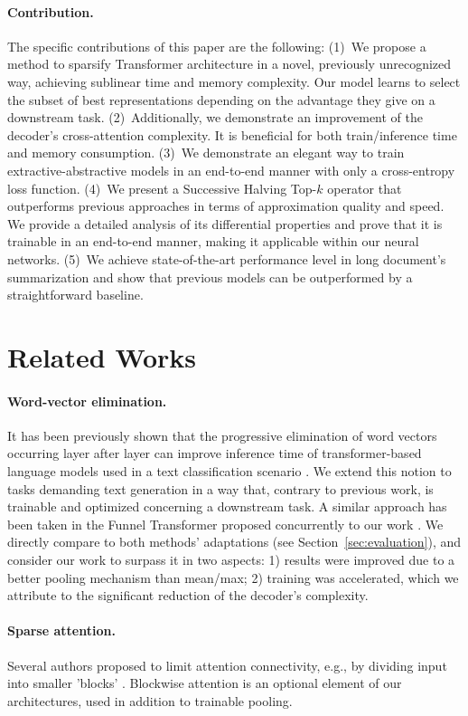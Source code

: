 \documentclass{article}
\begin{document}
\paragraph{Contribution.} The specific contributions of this paper are the following: (1)~We propose a method to sparsify Transformer architecture in a novel, previously unrecognized way, achieving sublinear time and memory complexity. Our model learns to select the subset of best representations depending on the advantage they give on a downstream task.
(2)~Additionally, we demonstrate an improvement of the decoder's cross-attention complexity. It is beneficial for both train/inference time and memory consumption.
(3)~We demonstrate an elegant way to train extractive-abstractive models in an end-to-end manner with only a cross-entropy loss function. (4)~We present a Successive Halving Top-$k$ operator that outperforms previous approaches in terms of approximation quality and speed. We provide a detailed analysis of its differential properties and prove that it is trainable in an end-to-end manner, making it applicable within our neural networks. (5)~We achieve state-of-the-art performance level in long document's summarization and show that previous models can be outperformed by a straightforward baseline.

\section{Related Works}  
\paragraph{Word-vector elimination.}
It has been previously shown that the progressive elimination of word vectors occurring layer after layer can improve inference time of transformer-based language models used in a text classification scenario \cite{pmlr-v119-goyal20a}. We extend this notion to tasks demanding text generation in a way that, contrary to previous work, is trainable and optimized concerning a downstream task. A similar approach has been taken in the Funnel Transformer proposed concurrently to our work \citep{dai2020funneltransformer}. We directly compare to both methods' adaptations (see Section~\ref{sec:evaluation}), and consider our work to surpass it in two aspects: 1) results were improved due to a better pooling mechanism than mean/max; 2) training was accelerated, which we attribute to the significant reduction of the decoder's complexity.

\paragraph{Sparse attention.} 
Several authors proposed to limit attention connectivity, e.g., by dividing input into smaller 'blocks' \citep{child2019generating, Beltagy2020LongformerTL, rae-razavi-2020-transformers}. 
Blockwise attention is an optional element of our architectures, used in addition to trainable pooling.
\end{document}
